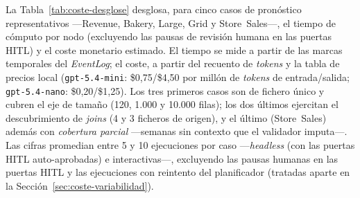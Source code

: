 La Tabla~\ref{tab:coste-desglose} desglosa, para cinco casos de pronóstico
representativos —Revenue, Bakery, Large, Grid y Store~Sales—, el
tiempo de cómputo por nodo (excluyendo las pausas de revisión humana en las puertas
HITL) y el coste monetario estimado. El tiempo se mide a partir de las marcas temporales
del \textit{EventLog}; el coste, a partir del recuento de \textit{tokens} y la tabla de
precios local (\texttt{gpt-5.4-mini}: \$0,75/\$4,50 por millón de \textit{tokens} de
entrada/salida; \texttt{gpt-5.4-nano}: \$0,20/\$1,25). Los tres primeros casos son de
fichero único y cubren el eje de tamaño (120, 1.000 y 10.000 filas); los dos últimos
ejercitan el descubrimiento de \textit{joins} (4 y 3 ficheros de origen), y el último
(Store~Sales) además con \emph{cobertura parcial} —semanas sin contexto que el validador imputa—.
Las cifras promedian
entre 5 y 10 ejecuciones por caso —\textit{headless} (con las puertas HITL auto-aprobadas)
e interactivas—, excluyendo las pausas humanas en las puertas HITL y las ejecuciones con
reintento del planificador (tratadas aparte en la Sección~\ref{sec:coste-variabilidad}).

